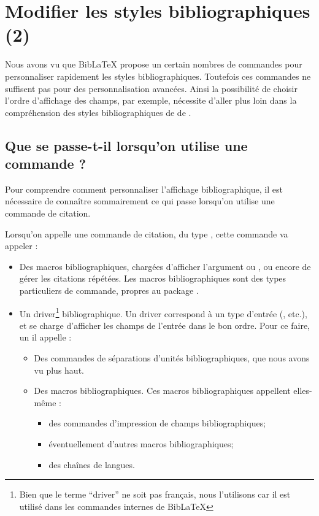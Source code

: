 \chapter{Modifier les styles bibliographiques (2)}

\begin{prealable}
	Nous avons vu que BibLaTeX propose un certain nombres de commandes pour personnaliser rapidement les styles bibliographiques. Toutefois  ces commandes ne suffisent pas pour des personnalisation avancées. 
	Ainsi la possibilité de choisir l'ordre d'affichage des champs, par exemple, nécessite d'aller plus loin dans la compréhension des styles bibliographiques de de .
\end{prealable}



\section{Que se passe-t-il lorsqu'on utilise une commande  ?}

Pour comprendre comment personnaliser l'affichage bibliographique, il est nécessaire de connaître sommairement ce qui passe lorsqu'on utilise une commande de citation. 


Lorsqu'on appelle une commande de citation, du type , cette commande va appeler :
	\begin{itemize}
		\item Des macros bibliographiques, chargées d'afficher l'argument  ou , ou encore de gérer les citations répétées. Les macros bibliographiques sont des types particuliers de commande, propres au package .\label{macrobiblio} 
		\item Un driver\footnote{Bien que le terme \enquote{driver} ne soit pas français, nous l'utilisons car il est utilisé dans les commandes internes de BibLaTeX} bibliographique. Un driver correspond à un type d'entrée (,  etc.), et se charge d'afficher les champs de l'entrée dans le bon ordre. Pour ce faire, un il appelle :
		\begin{itemize}
			\item Des commandes de séparations d'unités bibliographiques, que nous avons vu plus haut.
			\item Des macros bibliographiques. Ces macros bibliographiques appellent elles-même :
			\begin{itemize}
				\item des commandes d'impression de champs bibliographiques;
				\item éventuellement d'autres macros bibliographiques;
				\item des chaînes de langues.
			\end{itemize}
		\end{itemize}
		
	\end{itemize}

